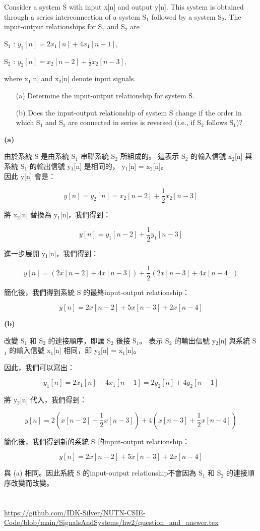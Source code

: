\documentclass[12pt,a4paper]{article}
\begin{document}
\parbox[t]{\dimexpr\linewidth-\question}{
  Consider a system S with input x[n] and output y[n]. This system is obtained through a series interconnection of a system S\(_1\) followed by a system S\(_2\). The input-output relationships for S\(_1\) and S\(_2\) are

  S\(_1\) : \(y_1[n] = 2x_1[n] + 4x_1[n - 1]\),
  
  S\(_2\) : \(y_2[n] = x_2[n - 2] + \frac{1}{2}x_2[n - 3]\),
  
  where x\(_1\)[n] and x\(_2\)[n] denote input signals.
  \noindent \begin{itemize}
    \item[(a)] Determine the input-output relationship for system S.
    \item[(b)] Does the input-output relationship of system S change if the order in which S\(_1\) and S\(_2\) are connected in series is reversed (i.e., if S\(_2\) follows S\(_1\))?
  \end{itemize}
}


{\bf (a)} 
\parbox[t]{\dimexpr\linewidth-\question} {
由於系統 S 是由系統 S\(_1\) 串聯系統 S\(_2\) 所組成的。
這表示 S\(_2\) 的輸入信號 x\(_2\)[n]  
與系統 S\(_1\) 的輸出信號 y\(_1\)[n] 是相同的， y\(_1\)[n] = x\(_2\)[n]。
\\因此 y[n] 會是：

\[
y[n] = y_2[n] = x_2[n - 2] + \frac{1}{2}x_2[n - 3]
\]

將 x\(_2\)[n] 替換為 y\(_1\)[n]，我們得到：

\[
y[n] = y_1[n - 2] + \frac{1}{2}y_1[n - 3]
\]

進一步展開 y\(_1\)[n]，我們得到：

\[
y[n] = (2x[n - 2] + 4x[n - 3]) + \frac{1}{2}(2x[n - 3] + 4x[n - 4])
\]

簡化後，我們得到系統 S 的最終input-output relationship：

\[
y[n] = 2x[n - 2] + 5x[n - 3] + 2x[n - 4]
\]
}

{\bf (b)} 
\parbox[t]{\dimexpr\linewidth-\question} {
改變 S\(_1\) 和 S\(_2\) 的連接順序，即讓 S\(_2\) 後接 S\(_1\)。
表示 S\(_2\) 的輸出信號 y\(_2\)[n] 
與系統 S\(_1\) 的輸入信號 x\(_1\)[n] 相同，即 y\(_2\)[n] = x\(_1\)[n]。

因此，我們可以寫出：

\[
y_1[n] = 2x_1[n] + 4x_1[n - 1] = 2y_2[n] + 4y_2[n - 1]
\]

將 y\(_2\)[n] 代入，我們得到：

\[
y[n] = 2(x[n - 2] + \frac{1}{2}x[n - 3]) + 4(x[n - 3] + \frac{1}{2}x[n - 4])
\]

簡化後，我們得到新的系統 S 的input-output relationship：

\[
y[n] = 2x[n - 2] + 5x[n - 3] + 2x[n - 4]
\]

與 (a) 相同。因此系統 S 的input-output relationship不會因為 S\(_1\) 和 S\(_2\) 的連接順序改變而改變。
}



\section*{\heiti \color{black}{SourceCode}}
\sloppy
\noindent \url{https://github.com/IDK-Silver/NUTN-CSIE-Code/blob/main/SignalsAndSystems/hw2/question_and_answer.tex}
\end{document}
